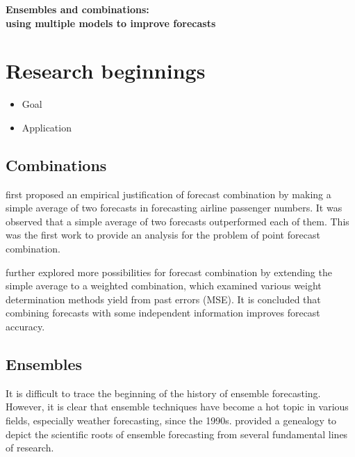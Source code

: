 \documentclass[11pt]{article}
\begin{document}
\def\spacingset#1{\renewcommand{\baselinestretch}%
{#1}\small\normalsize} \spacingset{1}

\begin{center}
{\bf\Large Ensembles and combinations:\\using multiple models to improve forecasts}
\end{center}


\bigskip


\spacingset{1.5} 

\section{Research beginnings}
\begin{itemize}
\item Goal
\item Application
\end{itemize}

\subsection{Combinations}

\cite{barnard1963new} first proposed an empirical justification of forecast combination by making a simple average of two forecasts in forecasting airline passenger numbers. It was observed that a simple average of two forecasts outperformed each of them. This was the first work to provide an analysis for the problem of point forecast combination.

\cite{bates1969combination} further explored more possibilities for forecast combination by extending the simple average to a weighted combination, which examined various weight determination methods yield from past errors (MSE). It is concluded that combining forecasts with some independent information improves forecast accuracy.

\subsection{Ensembles}

It is difficult to trace the beginning of the history of ensemble forecasting. However, it is clear that ensemble techniques have become a hot topic in various fields, especially weather forecasting, since the 1990s. \cite{lewis2005roots} provided a genealogy to depict the scientific roots of ensemble forecasting from several fundamental lines of research.
\end{document}
